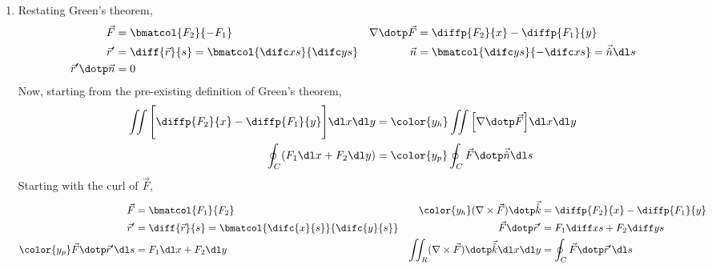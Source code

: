 \begin{enumerate}
    \item Restating Green's theorem,
          \begin{align}
              \vec{F}                        & = \bmatcol{F_2}{-F_1}               &
              \nabla \dotp \vec{F}           & = \diffp {F_2}{x} - \diffp {F_1}{y}   \\
              \vec{r}'                       & = \diff {\vec{r}}{s}
              = \bmatcol{\difc xs}{\difc ys} &
              \vec{n}                        & = \bmatcol{\difc ys}{-\difc xs}
              = \vec{\hat{n}} \dl s                                                  \\
              \vec{r}' \dotp \vec{n}         & = 0                                 &
          \end{align}
          Now, starting from the pre-existing definition of Green's theorem,
          \begin{align}
              \iint \Bigg[\diffp {F_2}{x} - \diffp{F_1}{y}\Bigg] \dl x \dl y & =
              \color{y_h} \iint \Big[\nabla \dotp \vec{F}\Big] \dl x \dl y       \\
              \oint_C (F_1 \dl x + F_2 \dl y)                                & =
              \color{y_p} \oint_C \vec{F} \dotp \vec{\hat{n}} \dl s
          \end{align}
          Starting with the curl of $ \vec{F} $,
          \begin{align}
              \vec{F}                                  & = \bmatcol{F_1}{F_2}    &
              \color{y_h} (\nabla \times \vec{F})
              \dotp \vec{\hat{k}}                      & =
              \diffp {F_2}{x} - \diffp{F_1}{y}                                     \\
              \vec{r}'                                 & = \diff {\vec{r}}{s}
              = \bmatcol{\difc{x}{s}}{\difc{y}{s}}     &
              \vec{F} \dotp \vec{r}'                   & =
              F_1 \diff xs + F_2 \diff ys                                          \\
              \color{y_p} \vec{F} \dotp \vec{r}' \dl s & = F_1 \dl x + F_2 \dl y &
              \iint_R (\nabla \times \vec{F}) \dotp
              \vec{\hat{k}} \dl x \dl y                & = \oint_C \vec{F} \dotp
              \vec{r}' \dl s
          \end{align}


\end{enumerate}
